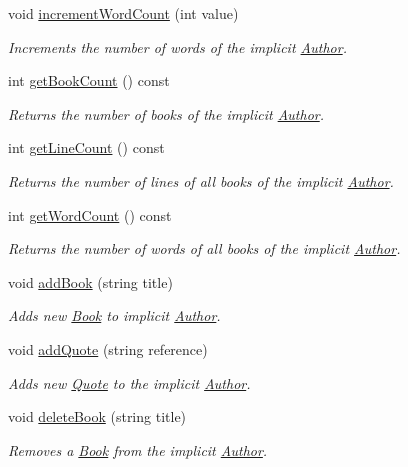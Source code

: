 \begin{DoxyCompactItemize}
void \hyperlink{class_author_af12d32bb751a9ac3e1508631e4d8fb8e}{increment\+Word\+Count} (int value)
\begin{DoxyCompactList}\small\item\em Increments the number of words of the implicit \hyperlink{class_author}{Author}. \end{DoxyCompactList}\item 
int \hyperlink{class_author_a78febe94924896f8d0ce218d5cd41786}{get\+Book\+Count} () const 
\begin{DoxyCompactList}\small\item\em Returns the number of books of the implicit \hyperlink{class_author}{Author}. \end{DoxyCompactList}\item 
int \hyperlink{class_author_af24acf9a0c70fc700edccfb956c2bace}{get\+Line\+Count} () const 
\begin{DoxyCompactList}\small\item\em Returns the number of lines of all books of the implicit \hyperlink{class_author}{Author}. \end{DoxyCompactList}\item 
int \hyperlink{class_author_a4899e9145b70a9e6fcad9a55b3b5285d}{get\+Word\+Count} () const 
\begin{DoxyCompactList}\small\item\em Returns the number of words of all books of the implicit \hyperlink{class_author}{Author}. \end{DoxyCompactList}\item 
void \hyperlink{class_author_a5836c0e00e740d4e9e9049e94f032cc3}{add\+Book} (string title)
\begin{DoxyCompactList}\small\item\em Adds new \hyperlink{class_book}{Book} to implicit \hyperlink{class_author}{Author}. \end{DoxyCompactList}\item 
void \hyperlink{class_author_a8605dbbab320ca251f3c64e782cf40b3}{add\+Quote} (string reference)
\begin{DoxyCompactList}\small\item\em Adds new \hyperlink{class_quote}{Quote} to the implicit \hyperlink{class_author}{Author}. \end{DoxyCompactList}\item 
void \hyperlink{class_author_ad48c2d5ae47d521bf5d4aa638bb86976}{delete\+Book} (string title)
\begin{DoxyCompactList}\small\item\em Removes a \hyperlink{class_book}{Book} from the implicit \hyperlink{class_author}{Author}. \end{DoxyCompactList}\item 

\end{DoxyCompactItemize}
